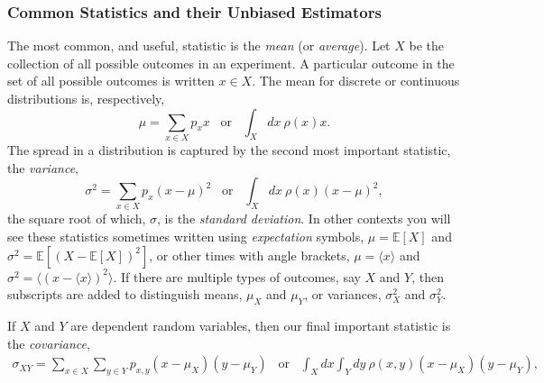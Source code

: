 \documentclass[addpoints]{physlabs}  %
\begin{document}
\begin{labsection}
\begin{theory}
\subsubsection*{Common Statistics and their Unbiased Estimators}
The most common, and useful, statistic is the \textit{mean} (or \textit{average}).
Let $X$ be the collection of all possible outcomes in an experiment.
A particular outcome in the set of all possible outcomes is written $x\in X$.
The mean for discrete or continuous distributions is, respectively,
\begin{equation*}
    \mu = \sum_{x\in X}p_x x\hspace{10pt}\text{or}\hspace{10pt}\int_X \!\!\!dx\ \rho(x) x.
\end{equation*}
The spread in a distribution is captured by the second most important statistic, the \textit{variance},
\begin{equation*}
    \sigma^2 = \sum_{x\in X} p_x(x-\mu)^2\hspace{10pt}\text{or}\hspace{10pt}\int_X \!\!\!dx\ \rho(x) (x-\mu)^2,
\end{equation*}
the square root of which, $\sigma$, is the \textit{standard deviation}.
In other contexts you will see these statistics sometimes written using \textit{expectation} symbols, $\mu=\mathds{E}[X]$ and $\sigma^2=\mathds{E}[(X-\mathds{E}[X])^2]$, or other times with angle brackets, $\mu=\langle x\rangle$ and $\sigma^2=\langle(x-\langle x\rangle)^2\rangle$.
If there are multiple types of outcomes, say $X$ and $Y$, then subscripts are added to distinguish means, $\mu_X$ and $\mu_Y$, or variances, $\sigma_X^2$ and $\sigma_Y^2$.

If $X$ and $Y$ are dependent random variables, then our final important statistic is the \textit{covariance},
\begin{align*}
    \sigma_{XY}=\sum_{x\in X}\sum_{y\in Y}p_{x,y}(x-\mu_X)(y-\mu_Y)\hspace{10pt}\text{or}\hspace{10pt}\int_X \!\!\!dx\!\! \int_Y \!\!\!dy\ \rho(x,y) (x-\mu_X)(y-\mu_Y),
\end{align*}




\end{theory}
\end{labsection}
\end{document}
